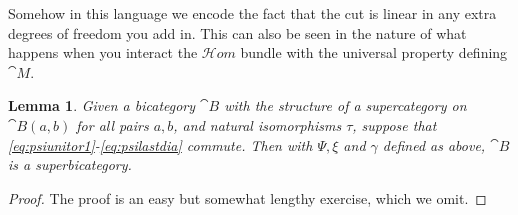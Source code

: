 \documentclass[english,letter paper,12pt,leqno]{article}
\newtheorem{lemma}[theorem]{Lemma}
\theoremstyle{example}
\numberwithin{equation}{section}
\begin{document}
Somehow in this language we encode the fact that the cut is linear in any extra degrees of freedom you add in. This can also be seen in the nature of what happens when you interact the $\mathscr{H}\!om$ bundle with the universal property defining $\cat{M}$.


\begin{lemma}\label{lemma:constructingsuper}
Given a bicategory $\cat{B}$ with the structure of a supercategory on $\cat{B}(a,b)$ for all pairs $a,b$, and natural isomorphisms $\tau$, suppose that \eqref{eq:psiunitor1}-\eqref{eq:psilastdia} commute. Then with $\Psi, \xi$ and $\gamma$ defined as above, $\cat{B}$ is a superbicategory.
\end{lemma}
\begin{proof}
The proof is an easy but somewhat lengthy exercise, which we omit.
\end{proof}
\end{document}
